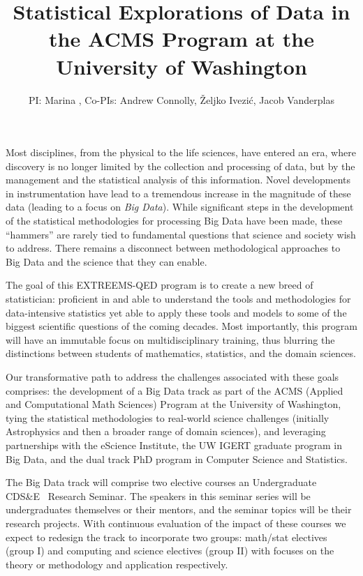 \documentclass[nofootbib,floatfix,11pt]{article}
\title{Statistical Explorations of Data in the {ACMS} {Program} at the
  {University} of {Washington}}
\author{PI: Marina \meila, Co-PIs: Andrew Connolly, \v{Z}eljko Ivezi\'{c}, Jacob Vanderplas}
\newcommand{\cdse}{CDS\&E}
\begin{document}

Most disciplines, from the physical to the life sciences, have entered
an era, where discovery is no longer limited by the collection and
processing of data, but by the management and the statistical analysis
of this information. Novel developments in instrumentation have lead
to a tremendous increase in the magnitude of these data (leading to a
focus on \emph{Big Data}).  While significant steps in the development
of the statistical methodologies for processing Big Data have been
made, these ``hammers'' are rarely tied to fundamental questions that
science and society wish to address. There remains a disconnect
between methodological approaches to Big Data and the science that
they can enable.

The goal of this EXTREEMS-QED program is to create a new breed of
statistician: proficient in and able to understand the tools and
methodologies for data-intensive statistics yet able to apply these
tools and models to some of the biggest scientific questions of the
coming decades.  Most importantly, this program will have an immutable
focus on multidisciplinary training, thus blurring the distinctions
between students of mathematics, statistics, and the domain sciences.

Our transformative path to address the challenges associated with
these goals comprises: the development of a Big Data track as part of
the ACMS (Applied and Computational Math Sciences) Program at the
University of Washington, tying the statistical methodologies to
real-world science challenges (initially Astrophysics and then a
broader range of domain sciences), and leveraging partnerships with
the eScience Institute, the UW IGERT graduate program in Big Data, and
the dual track PhD program in Computer Science and Statistics. 

The Big Data track will comprise two elective courses an Undergraduate
\cdse~ Research Seminar. The speakers in this seminar series will be
undergraduates themselves or their mentors, and the seminar topics
will be their research projects. With continuous evaluation of the
impact of these courses we expect to redesign the track to incorporate
two groups: math/stat electives (group I) and computing and science
electives (group II) with focuses on the theory or methodology and
application respectively.
\end{document}

